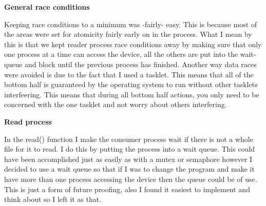 \documentclass[10pt]{article}
\begin{document}
\textbf{General race conditions}

Keeping race conditions to a minimum was -fairly- easy. This is because most of the areas were set for atomicity fairly early on in the process. What I mean by this is that we kept reader process race conditions away by making sure that only one process at a time can access the device, all the others are put into the wait-queue and block until the previous process has finished. Another way data races were avoided is due to the fact that I used a tasklet. This means that all of the bottom half is guaranteed by the operating system to run without other tasklets interfeering. This means that during all bottom half actions, you only need to be concerned with the one tasklet and not worry about others interfering. 

\textbf{Read process}

In the read() function I make the consumer process wait if there is not a whole file for it to read. I do this by putting the process into a wait queue. This could have been accomplished just as easily as with a mutex or semaphore however I decided to use a wait queue so that if I was to change the program and make it have more than one process accessing the device then the queue could be of use. This is just a form of future proofing, also I found it easiest to implement and think about so I left it as that. 
\end{document}
